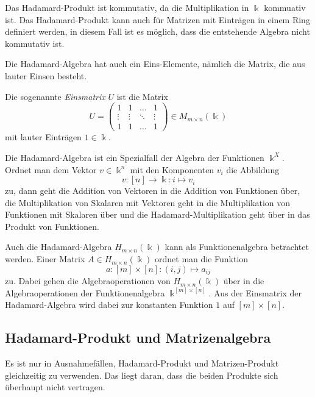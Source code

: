 Das Hadamard-Produkt ist kommutativ, da die Multiplikation in $\Bbbk$
kommuativ ist.
Das Hadamard-Produkt kann auch für Matrizen mit Einträgen in einem
Ring definiert werden, in diesem Fall ist es möglich, dass die entstehende
Algebra nicht kommutativ ist.

Die Hadamard-Algebra hat auch ein Eins-Elemente, nämlich die Matrix,
die aus lauter Einsen besteht.

\begin{definition}
Die sogenannte {\em Einsmatrix} $U$ ist die Matrix
\[
U=\begin{pmatrix}
1&1&\dots&1\\
\vdots&\vdots&\ddots&\vdots\\
1&1&\dots&1
\end{pmatrix}
\in
M_{m\times n}(\Bbbk)
\]
mit lauter Einträgen $1\in\Bbbk$.
\end{definition}

Die Hadamard-Algebra ist ein Spezialfall der Algebra der Funktionen
$\Bbbk^X$.
Ordnet man dem Vektor $v\in \Bbbk^n$ mit den Komponenten $v_i$ 
die Abbildung
\[
v\colon [n] \to \Bbbk: i \mapsto v_i
\]
zu, dann geht die Addition von Vektoren in die Addition von
Funktionen über, die Multiplikation von Skalaren mit Vektoren
geht in die Multiplikation von Funktionen mit Skalaren über 
und die Hadamard-Multiplikation geht über in das Produkt von
Funktionen.

Auch die Hadamard-Algebra $H_{m\times n}(\Bbbk)$ kann als Funktionenalgebra
betrachtet werden.
Einer Matrix $A\in H_{m\times n}(\Bbbk)$ ordnet man die Funktion
\[
a\colon [m]\times [n] : (i,j) \mapsto a_{i\!j}
\]
zu.
Dabei gehen die Algebraoperationen von $H_{m\times n}(\Bbbk)$ über
in die Algebraoperationen der Funktionenalgebra $\Bbbk^{[m]\times [n]}$.
Aus der Einsmatrix der Hadamard-Algebra wird dabei zur konstanten
Funktion $1$ auf $[m]\times[n]$.

\subsection{Hadamard-Produkt und Matrizenalgebra
\label{buch:vektorenmatrizen:subsection:vertraeglichkeit}}
Es ist nur in Ausnahmefällen, Hadamard-Produkt und Matrizen-Produkt
gleichzeitig zu verwenden.
Das liegt daran, dass die beiden Produkte sich überhaupt nicht 
vertragen.


